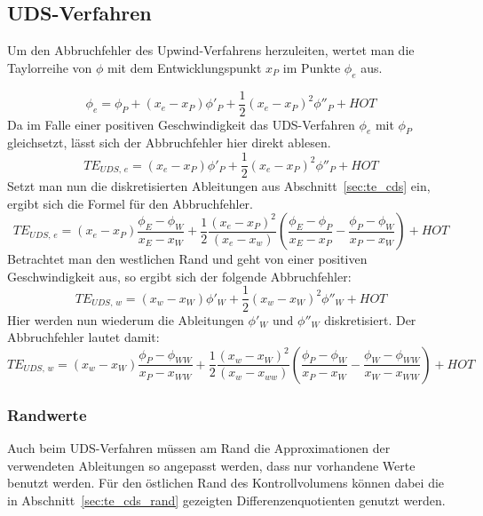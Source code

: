 \subsection{UDS-Verfahren}

Um den Abbruchfehler des Upwind-Verfahrens herzuleiten, wertet man die
Taylorreihe von $\phi$ mit dem Entwicklungspunkt $x_P$ im Punkte $\phi_e$
aus.

\begin{equation*}
  \phi_e = \phi_P +(x_e-x_P) \phi'_P + \frac{1}{2} (x_e-x_P)^2 \phi''_P+HOT
\end{equation*}
Da im Falle einer positiven Geschwindigkeit das UDS-Verfahren $\phi_e$ mit $\phi_P$
gleichsetzt, lässt sich der Abbruchfehler hier direkt ablesen.
\begin{equation*}
  TE_{UDS,\,e} = (x_e-x_P) \phi'_P + \frac{1}{2} (x_e-x_P)^2 \phi''_P+HOT
\end{equation*}
Setzt man nun die diskretisierten Ableitungen aus Abschnitt~\ref{sec:te_cds} ein,
ergibt sich die Formel für den Abbruchfehler.
\begin{equation}
  TE_{UDS,\,e} = (x_e-x_P) \frac{\phi_E-\phi_W}{x_E-x_W}+
  \frac{1}{2} \frac{(x_e-x_P)^2}{(x_e-x_w)} \left({\frac{\phi_E-\phi_P}{x_E-x_P}
  - \frac{\phi_P-\phi_W}{x_P-x_W} }\right)+HOT
\end{equation}
Betrachtet man den westlichen Rand und geht von einer positiven Geschwindigkeit aus,
so ergibt sich der folgende Abbruchfehler:
\begin{equation*}
  TE_{UDS,\,w} = (x_w-x_W) \phi'_W + \frac{1}{2} (x_w-x_W)^2 \phi''_W + HOT
\end{equation*}
Hier werden nun wiederum die Ableitungen $\phi'_W$ und $\phi''_W$ diskretisiert. Der
Abbruchfehler lautet damit:
\begin{equation}
  TE_{UDS,\,w} = (x_w-x_W) \frac{\phi_P-\phi_{WW}}{x_P-x_{WW}}+
  \frac{1}{2} \frac{(x_w-x_W)^2}{(x_w-x_{ww})} \left({\frac{\phi_P-\phi_W}{x_P-x_W}
  - \frac{\phi_W-\phi_{WW}}{x_W-x_{WW}} }\right)+HOT
\end{equation}



\subsubsection{Randwerte}

Auch beim UDS-Verfahren müssen am Rand die Approximationen der verwendeten Ableitungen
so angepasst werden, dass nur vorhandene Werte benutzt werden.
Für den östlichen Rand des Kontrollvolumens können dabei die in Abschnitt~\ref{sec:te_cds_rand}
gezeigten Differenzenquotienten genutzt werden.

